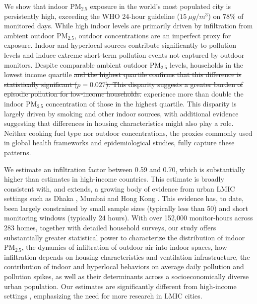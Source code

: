 \documentclass[reqno,12pt,notitlepage]{article}
\providecommand{\DIFadd}[1]{{\protect\color{BLUE}#1}} %
\providecommand{\DIFdel}[1]{{\protect\color{red}\sout{#1}}} %
\providecommand{\DIFaddbegin}{} %
\providecommand{\DIFaddend}{} %
\providecommand{\DIFdelbegin}{} %
\providecommand{\DIFdelend}{} %
\begin{document}
\DIFadd{We show that indoor PM$_{2.5}$ exposure in the world's most populated city is persistently high, exceeding the WHO 24-hour guideline ($15~\mu g/m^3$) on 78\% of monitored days. While high indoor levels are primarily driven by infiltration from ambient outdoor PM$_{2.5}$, outdoor concentrations are an imperfect proxy for exposure. Indoor and hyperlocal sources contribute significantly to pollution levels and induce extreme short-term pollution events not captured by outdoor monitors. Despite comparable ambient outdoor PM$_{2.5}$ levels, households in the }\DIFaddend lowest income quartile \DIFdelbegin \DIFdel{and the highest quartile confirms that this difference is statistically significant ($p = 0.027$).
This disparity suggests a greater burden of episodic pollution for low-income households.
}\DIFdelend \DIFaddbegin \DIFadd{experience more than double the indoor PM$_{2.5}$ concentration of those in the highest quartile. This disparity is largely driven by smoking and other indoor sources, with additional evidence suggesting that differences in housing characteristics might also play a role. Neither cooking fuel type nor outdoor concentrations, the proxies commonly used in global health frameworks and epidemiological studies, fully capture these patterns.
}

\DIFadd{We estimate an infiltration factor between 0.59 and 0.70, which is substantially higher than estimates in high-income countries.
This estimate is broadly consistent with, and extends, a growing body of evidence from urban LMIC settings such as Dhaka \citep{Sahaetal2025}, Mumbai \citep{Anandetal2022} and Hong Kong \citep{Hossainetal2021}. This evidence has, to date, been largely constrained by small sample sizes (typically less than 50) and short monitoring windows (typically 24 hours). 
With over 152,000 monitor-hours across 283 homes, together with detailed household surveys, our study offers substantially greater statistical power to characterize the distribution of indoor PM$_{2.5}$, the dynamics of infiltration of outdoor air into indoor spaces, how infiltration depends on housing characteristics and ventilation infrastructure, the contribution of indoor and hyperlocal behaviors on average daily pollution and pollution spikes, as well as their determinants across a socioeconomically diverse urban population. Our estimates are significantly different from high-income settings \citep{krebs_using_2021, lunderberg_assessing_2023, burke_exposures_2022}, emphasizing the need for more research in LMIC cities.
}
\end{document}
